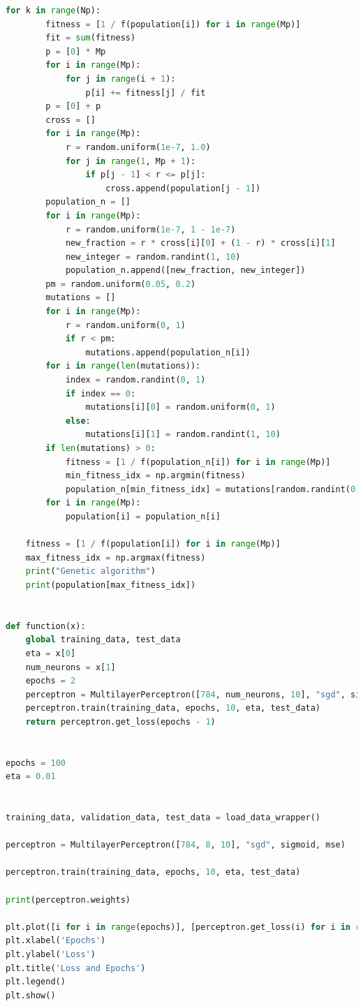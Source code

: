 \documentclass[a4paper, 14pt]{extarticle}
\begin{document}
\begin{lstlisting}[language={python},caption={Методы оптимизации на примере многослойного персептрона, генетический алгоритм},label={lst:code1}]
    for k in range(Np):
        fitness = [1 / f(population[i]) for i in range(Mp)]
        fit = sum(fitness)
        p = [0] * Mp
        for i in range(Mp):
            for j in range(i + 1):
                p[i] += fitness[j] / fit
        p = [0] + p
        cross = []
        for i in range(Mp):
            r = random.uniform(1e-7, 1.0)
            for j in range(1, Mp + 1):
                if p[j - 1] < r <= p[j]:
                    cross.append(population[j - 1])
        population_n = []
        for i in range(Mp):
            r = random.uniform(1e-7, 1 - 1e-7)
            new_fraction = r * cross[i][0] + (1 - r) * cross[i][1]
            new_integer = random.randint(1, 10)
            population_n.append([new_fraction, new_integer])
        pm = random.uniform(0.05, 0.2)
        mutations = []
        for i in range(Mp):
            r = random.uniform(0, 1)
            if r < pm:
                mutations.append(population_n[i])
        for i in range(len(mutations)):
            index = random.randint(0, 1)
            if index == 0:
                mutations[i][0] = random.uniform(0, 1)
            else:
                mutations[i][1] = random.randint(1, 10)
        if len(mutations) > 0:
            fitness = [1 / f(population_n[i]) for i in range(Mp)]
            min_fitness_idx = np.argmin(fitness)
            population_n[min_fitness_idx] = mutations[random.randint(0, len(mutations) - 1)]
        for i in range(Mp):
            population[i] = population_n[i]

    fitness = [1 / f(population[i]) for i in range(Mp)]
    max_fitness_idx = np.argmax(fitness)
    print("Genetic algorithm")
    print(population[max_fitness_idx])


def function(x):
    global training_data, test_data
    eta = x[0]
    num_neurons = x[1]
    epochs = 2
    perceptron = MultilayerPerceptron([784, num_neurons, 10], "sgd", sigmoid, mse)
    perceptron.train(training_data, epochs, 10, eta, test_data)
    return perceptron.get_loss(epochs - 1)


epochs = 100
eta = 0.01


training_data, validation_data, test_data = load_data_wrapper()

perceptron = MultilayerPerceptron([784, 8, 10], "sgd", sigmoid, mse)

perceptron.train(training_data, epochs, 10, eta, test_data)

print(perceptron.weights)

plt.plot([i for i in range(epochs)], [perceptron.get_loss(i) for i in range(epochs)], label='SGD', color='blue')
plt.xlabel('Epochs')
plt.ylabel('Loss')
plt.title('Loss and Epochs')
plt.legend()
plt.show()


\end{lstlisting}
\end{document}
